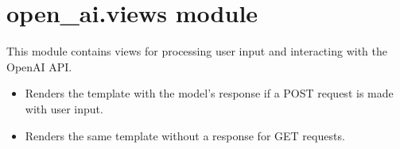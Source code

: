 \documentclass[letterpaper,10pt,english]{sphinxmanual}
\begin{document}
\section{open\_ai.views module}
\label{\detokenize{open_ai:open-ai-views-module}}
\sphinxAtStartPar
This module contains views for processing user input and interacting with the OpenAI API.


\begin{fulllineitems}
\label{\detokenize{open_ai:get--chatphi-}}
\pysigstartsignatures
{}\label{\detokenize{open_ai:get-Renders the chat interface for interacting with the Ollama Phi model.}}
\pysigstopsignatures\begin{description}
\begin{itemize}
\item {} 
\sphinxAtStartPar
Renders the  template with the model’s response if a POST request is made with user input.

\item {} 
\sphinxAtStartPar
Renders the same template without a response for GET requests.

\end{itemize}

\end{description}

\end{fulllineitems}

\label{\detokenize{open_ai:module-open_ai.views}}
\end{document}
